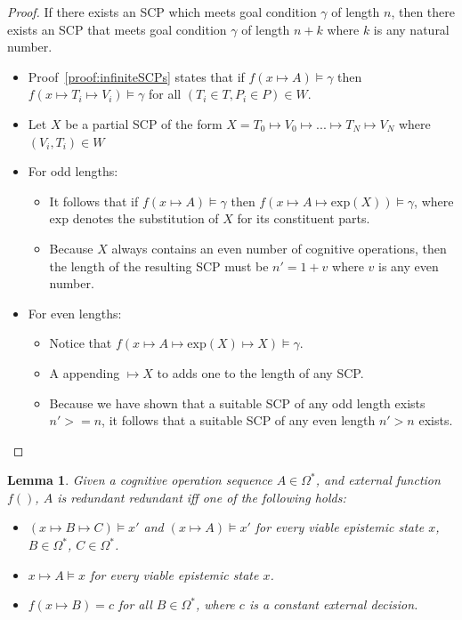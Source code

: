\documentclass[
11pt, %
english, %
singlespacing, %
headsepline, %
]{MastersDoctoralThesis} %
\newtheorem{proof}{Proof}
\newtheorem{lemma}{Lemma}
\begin{document}
\begin{proof} \label{proof:infiniteSCPLength}
If there exists an SCP which meets goal condition $\gamma$ of length $n$, then there exists an SCP that meets goal condition $\gamma$ of length $n+k$ where $k$ is any natural number.
\begin{itemize}

\item Proof~\ref{proof:infiniteSCPs} states that if $f(x \longmapsto A)\models \gamma$ then $f(x \longmapsto T_i \longmapsto V_i)\models \gamma$ for all $(T_i \in T, P_i \in P) \in W$.
\item Let $X$ be a partial SCP of the form $X=T_0 \longmapsto V_0 \longmapsto ... \longmapsto T_N \longmapsto V_{N}$ where $(V_i, T_i) \in W$
\item For odd lengths:
\begin{itemize}
\item  It follows that if $f(x \longmapsto A)\models \gamma$ then $f(x \longmapsto A \longmapsto \textrm{exp}(X))\models \gamma$, where $\textrm{exp}$ denotes the substitution of $X$ for its constituent parts.
\item Because $X$ always contains an even number of cognitive operations, then the length of the resulting SCP must be $n' = 1+v$ where $v$ is any even number.
\end{itemize}
\item For even lengths:
\begin{itemize}
\item Notice that $f(x \longmapsto A \longmapsto \textrm{exp}(X) \longmapsto X) \models \gamma$.
\item A appending $\longmapsto X$ to adds one to the length of any SCP.
\item Because we have shown that a suitable SCP of any odd length exists $n'>=n$, it follows that a suitable SCP of any even length $n'>n$ exists.
\end{itemize}
\end{itemize}

\end{proof}

\begin{lemma} \label{lem:uniredundant}
Given a cognitive operation sequence $A \in \Omega^*$, and external function $f()$, $A$ is redundant redundant iff one of the following holds:
\begin{itemize}
\item $(x \longmapsto B \longmapsto C) \models x'$ and $(x \longmapsto A) \models x'$ for every viable epistemic state $x$, $B \in \Omega^*$, $C \in \Omega^*$. 
\item $x \longmapsto A \models x$ for every viable epistemic state $x$.
\item $f(x \longmapsto B)=c$ for all $B \in \Omega^*$, where $c$ is a constant external decision.
\end{itemize}
\end{lemma}
\end{document}
